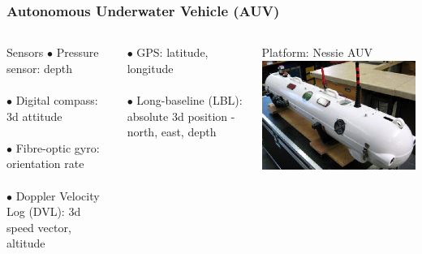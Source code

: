 \begin{frame} \frametitle{Autonomous Underwater Vehicle (AUV)}
\vspace{-25pt}
\begin{columns}[t]
	\begin{block}{Sensors}	
	$\bullet$ Pressure sensor: depth  \\
	 \\
	$\bullet$ Digital compass: 3d attitude  \\
	 \\
	$\bullet$ Fibre-optic gyro: orientation rate \\
	 \\
	$\bullet$ Doppler Velocity Log (DVL): 3d speed vector, altitude \\
	\end{block}
	$\bullet$ GPS: latitude, longitude  \\  
	 \\
	$\bullet$ Long-baseline (LBL): absolute 3d position - north, east, depth	

	\centering

	\begin{block}{Platform: Nessie AUV}
	\centering
	\includegraphics[width=0.8\linewidth]{fig/nessie.pdf}
	\end{block}


\end{columns}
\end{frame}
